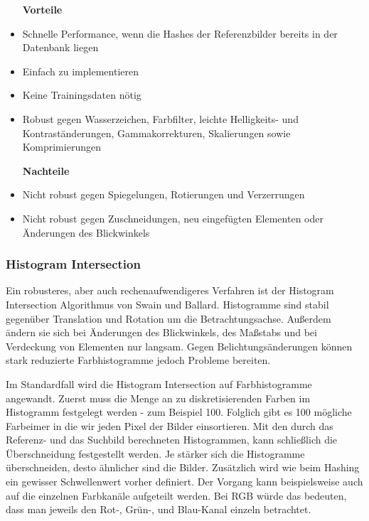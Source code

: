 \documentclass[a4paper,12pt]{article}
\begin{document}
\begin{itemize}
    \item [\textbf{Vorteile}]
    \item Schnelle Performance, wenn die Hashes der Referenzbilder bereits in
    der Datenbank liegen
    \item Einfach zu implementieren
    \item Keine Trainingsdaten nötig
    \item Robust gegen Wasserzeichen, Farbfilter, leichte Helligkeits- und
    Kontraständerungen, Gammakorrekturen, Skalierungen sowie Komprimierungen
\end{itemize}

\begin{itemize}
    \item [\textbf{Nachteile}]
    \item Nicht robust gegen Spiegelungen, Rotierungen und Verzerrungen
    \item Nicht robust gegen Zuschneidungen, neu eingefügten Elementen oder
    Änderungen des Blickwinkels
\end{itemize}

\newpage

\subsubsection{Histogram Intersection}
Ein robusteres, aber auch rechenaufwendigeres Verfahren ist der Histogram
Intersection Algorithmus von Swain und Ballard. Histogramme sind stabil
gegenüber Translation und Rotation um die Betrachtungsachse. Außerdem ändern
sie sich bei Änderungen des Blickwinkels, des Maßstabs und bei Verdeckung von
Elementen nur langsam. Gegen Belichtungsänderungen können stark reduzierte
Farbhistogramme jedoch Probleme bereiten. 

Im Standardfall wird die Histogram Intersection auf Farbhistogramme angewandt. 
Zuerst muss die Menge an zu diskretisierenden Farben im Histogramm festgelegt
werden - zum Beispiel 100. Folglich gibt es 100 mögliche \glqq{}Farbeimer\grqq{}
in die wir jeden Pixel der Bilder einsortieren. Mit den durch das Referenz- und
das Suchbild berechneten Histogrammen, kann schließlich die Überschneidung
festgestellt werden. Je stärker sich die Histogramme überschneiden, desto
ähnlicher sind die Bilder. Zusätzlich wird wie beim Hashing ein gewisser
Schwellenwert vorher definiert. Der Vorgang kann beispielsweise auch auf die
einzelnen Farbkanäle aufgeteilt werden. Bei RGB würde das bedeuten, dass man
jeweils den Rot-, Grün-, und Blau-Kanal einzeln betrachtet. 
\end{document}
